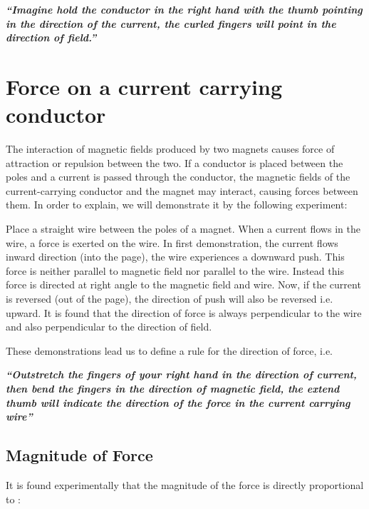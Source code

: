 \textit{\textbf{“Imagine hold the conductor in the right hand with the
thumb pointing in the direction of the current, the curled fingers will
point in the direction of field.”}}

\section{Force on a current carrying conductor}
The interaction of magnetic fields produced by two magnets causes force
of attraction or repulsion between the two. If a conductor is placed
between the poles and a current is passed through the conductor, the magnetic fields of the current-carrying conductor and the magnet may interact, causing forces between them. In order to explain, we will demonstrate it by the following experiment:

Place a straight wire between the poles of a magnet. When a current flows in the wire, a force is exerted on the wire. In first demonstration, the current flows inward direction (into the page), the wire experiences a downward push. This force is neither parallel to magnetic field nor parallel to the wire. Instead this force is directed at right angle to the magnetic field and wire. Now, if the current is reversed (out of the page), the direction of push will also be reversed i.e. upward. It is found that the direction of force is
always perpendicular to the wire and also perpendicular to the direction of
field.


These demonstrations lead us to define a rule for the direction of 
force, i.e.

\textit{\textbf{“Outstretch the fingers of your right hand in the direction
of current, then bend the fingers in the direction of magnetic field,
the extend thumb will indicate the direction of the force in the
current carrying wire”}}

\subsection*{Magnitude of Force}
 It is found experimentally that the magnitude of the force is directly
 proportional to :

